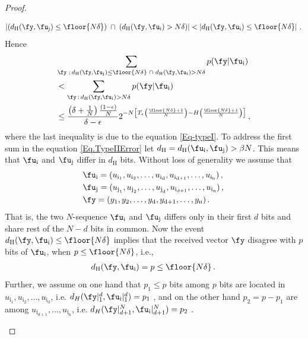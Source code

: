 \begin{proof}
\begin{itemize}
\begin{enumerate}
\begin{align}
    \label{event.Ineq}
    \left|\left(d_{\text{H}}(\fy,\fu_{\text{j}}) \leq \floor{N\delta}\right) \;\cap \; \left(d_{\text{H}}(\fy,\fu_{\text{i}}\right) > N\delta)\right|  < \left|d_{\text{H}}(\fy,\fu_{\text{i}}) \leq \floor{N\delta} \right| \,.\,
\end{align}
Hence
\begin{align}
    & \sum_{\fy\;;\,d_{\text{H}}(\fy,\fu_{\text{j}}) \leq \floor{N\delta} \; \cap \; d_{\text{H}}(\fy,\fu_{\text{i}}) > N\delta} p(\fy|\fu_{\text{i}})
    \nonumber\\
    & < \sum_{\fy\,:\, d_{\text{H}}(\fy,\fu_{\text{i}})  > N\delta} p(\fy|\fu_{\text{i}}) 
    \nonumber\\
    & \leq \frac{\left(\delta+\frac{1}{N}\right)\frac{\left(1 - \epsilon\right)}{N}}{\delta - \epsilon} 2^{-N\left[T_\epsilon\left(\frac{\floor{N\delta}+1}{N}\right)-H\left(\frac{\floor{N\delta}+1}{N}\right)\right]}
    \,,\,
\end{align} 
where the last inequality is due to the equation \eqref{Eq-typeI}.\newline
To address the first sum in the equation \eqref{Eq.TypeIIError} let $d_{\text{H}}=d_{\text{H}}(\fu_{\text{i}},\fu_{\text{j}}) > \beta N$. This means that $\fu_{\text{i}}$ and $\fu_{\text{j}}$ differ in $d_{\text{H}}$ bits. Without loss of generality we assume that
\begin{align}
    \label{Eq.Sequences}
    &\fu_\text{i} = (u_{\text{i}_1},u_{\text{i}_2},\ldots,u_{\text{i}_\text{d}},u_{\text{i}_\text{d+1}},\ldots,u_{\text{i}_\text{n}})\,,\,
    \nonumber
    \\
    &\fu_\text{j}= (u_{\text{j}_1},u_{\text{j}_2},\ldots,u_{\text{j}_\text{d}},u_{\text{i}_\text{d+1}},\ldots,u_{\text{i}_\text{n}})\,,\,
    \nonumber
    \\
    &\fy = (y_1,y_2,\ldots,y_\text{d},y_\text{d+1},\ldots,y_\text{n})\,.\,
 \end{align}
That is, the two $N$-sequence $\fu_{\text{i}}$ and $\fu_{\text{j}}$ differs only in their first $d$ bits and share rest of the $N-d$ bits in common. Now the event $d_{\text{H}}(\fy,\fu_{\text{i}}) \leq \floor{N\delta}$ implies that the received vector $\fy$ disagree with $p$ bits of $\fu_{\text{i}}$, when $p\leq \floor{N\delta}$, i.e.,
\begin{align}
    d_{\text{H}}(\fy,\fu_{\text{i}}) = p \leq \floor{N\delta} \,.\,
\end{align}
Further, we assume on one hand that $p_1\leq p$ bits among $p$ bits are located in $u_{\text{i}_1},u_{\text{i}_2},\ldots,u_{\text{i}_{\text{d}}}$, i.e. $d_H(\fy|_1^d,{\fu_\text{i}}|_1^d) = p_1$ , and on the other hand $p_2=p-p_1$ are among $u_{\text{i}_{d+1}},\ldots,u_{\text{i}_{\text{n}}}$, i.e. $d_H(\fy|_{d+1}^N,{\fu_\text{i}}|_{d+1}^N) = p_2$ .\newline 

\end{enumerate}
\end{itemize}
\end{proof}
